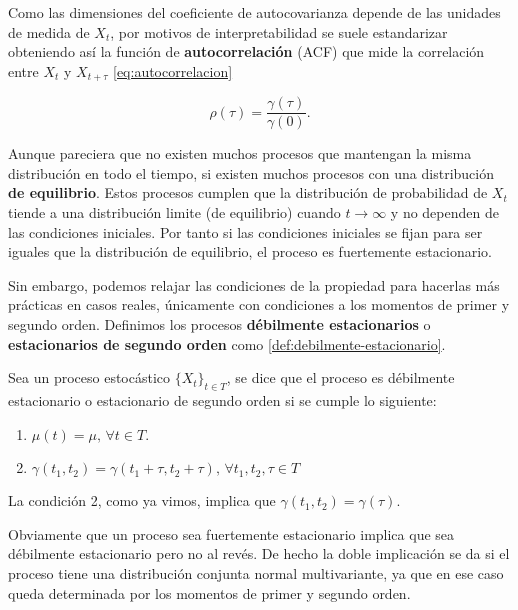Como las dimensiones del coeficiente de autocovarianza depende de las unidades de medida de $X_t$, por motivos de interpretabilidad se suele estandarizar obteniendo así la función de \textbf{autocorrelación} (ACF) que mide la correlación entre $X_t$ y $X_{t + \tau}$ \eqref{eq:autocorrelacion}

\begin{equation}
  \rho(\tau) = \dfrac{\gamma(\tau)}{\gamma(0)}.
  \label{eq:autocorrelacion}
\end{equation}

Aunque pareciera que no existen muchos procesos que mantengan la misma distribución en todo el tiempo, si existen muchos procesos con una distribución \textbf{de equilibrio}. Estos procesos cumplen que la distribución de probabilidad de $X_t$ tiende a una distribución limite (de equilibrio) cuando $t \to \infty$ y no dependen de las condiciones iniciales. Por tanto si las condiciones iniciales se fijan para ser iguales que la distribución de equilibrio, el proceso es fuertemente estacionario.

Sin embargo, podemos relajar las condiciones de la propiedad para hacerlas más prácticas en casos reales, únicamente con condiciones a los momentos de primer y segundo orden. Definimos los procesos \textbf{débilmente estacionarios} o \textbf{estacionarios de segundo orden} como \autoref{def:debilmente-estacionario}.

\begin{definicion}
  Sea un proceso estocástico $\{X_t\}_{t \in T}$, se dice que el proceso es débilmente estacionario o estacionario de segundo orden si se cumple lo siguiente:

  \begin{enumerate}
    \item $\mu(t) = \mu, \, \forall t \in T$.
    \item $\gamma(t_1, t_2) = \gamma  (t_1 + \tau, t_2 + \tau), \, \forall t_1, t_2, \tau \in T$
  \end{enumerate}

  La condición 2, como ya vimos, implica que $\gamma(t_1, t_2) = \gamma(\tau)$.
  \label{def:debilmente-estacionario}
\end{definicion}

Obviamente que un proceso sea fuertemente estacionario implica que sea débilmente estacionario pero no al revés. De hecho la doble implicación se da si el proceso tiene una distribución conjunta normal multivariante, ya que en ese caso queda determinada por los momentos de primer y segundo orden.


